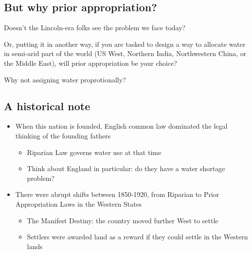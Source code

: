 \documentclass[]{article}
\providecommand{\tightlist}{%
  \setlength{\itemsep}{0pt}\setlength{\parskip}{0pt}}
\begin{document}
\hypertarget{but-why-prior-appropriation}{%
\subsection{But why prior
appropriation?}\label{but-why-prior-appropriation}}

Doesn't the Lincoln-era folks see the problem we face today?

Or, putting it in another way, if you are tasked to design a way to
allocate water in semi-arid part of the world (US West, Northern India,
Northwestern China, or the Middle East), will prior appropriation be
your choice?

Why not assigning water proprotionally?

\hypertarget{a-historical-note}{%
\subsection{A historical note}\label{a-historical-note}}

\begin{itemize}
\tightlist
\item
  When this nation is founded, English common law dominated the legal
  thinking of the founding fathers

  \begin{itemize}
  \tightlist
  \item
    Riparian Law governs water use at that time
  \item
    Think about England in particular: do they have a water shortage
    problem?
  \end{itemize}
\item
  There were abrupt shifts between 1850-1920, from Riparian to Prior
  Appropriation Laws in the Western States

  \begin{itemize}
  \tightlist
  \item
    The Manifest Destiny: the country moved further West to settle
  \item
    Settlers were awarded land as a reward if they could settle in the
    Western lands
  \end{itemize}
\end{itemize}

\hypertarget{section-36}{%
\subsection{}\label{section-36}}
\end{document}

